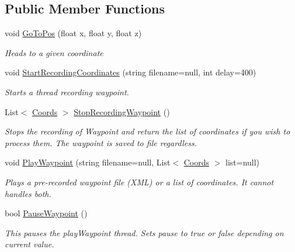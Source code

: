 \subsection*{Public Member Functions}
\begin{DoxyCompactItemize}
\item 
void \hyperlink{classffxivlib_1_1_movement_helper_a8706ad00f8ca28ee9a2272d45879d7cb}{Go\-To\-Pos} (float x, float y, float z)
\begin{DoxyCompactList}\small\item\em Heads to a given coordinate \end{DoxyCompactList}\item 
void \hyperlink{classffxivlib_1_1_movement_helper_a66d42147d0c8dbaba8688b02b28da555}{Start\-Recording\-Coordinates} (string filename=null, int delay=400)
\begin{DoxyCompactList}\small\item\em Starts a thread recording waypoint. \end{DoxyCompactList}\item 
List$<$ \hyperlink{structffxivlib_1_1_movement_helper_1_1_coords}{Coords} $>$ \hyperlink{classffxivlib_1_1_movement_helper_adb131c04b6f624007be210202fed5d60}{Stop\-Recording\-Waypoint} ()
\begin{DoxyCompactList}\small\item\em Stops the recording of Waypoint and return the list of coordinates if you wish to process them. The waypoint is saved to file regardless. \end{DoxyCompactList}\item 
void \hyperlink{classffxivlib_1_1_movement_helper_a907374f2640eef358e8293c194d70d48}{Play\-Waypoint} (string filename=null, List$<$ \hyperlink{structffxivlib_1_1_movement_helper_1_1_coords}{Coords} $>$ list=null)
\begin{DoxyCompactList}\small\item\em Plays a pre-\/recorded waypoint file (X\-M\-L) or a list of coordinates. It cannot handles both. \end{DoxyCompactList}\item 
bool \hyperlink{classffxivlib_1_1_movement_helper_a6c6b3bedbe39ca3570ca44cd6605bff2}{Pause\-Waypoint} ()
\begin{DoxyCompactList}\small\item\em This pauses the play\-Waypoint thread. Sets pause to true or false depending on current value. \end{DoxyCompactList}\end{DoxyCompactItemize}


